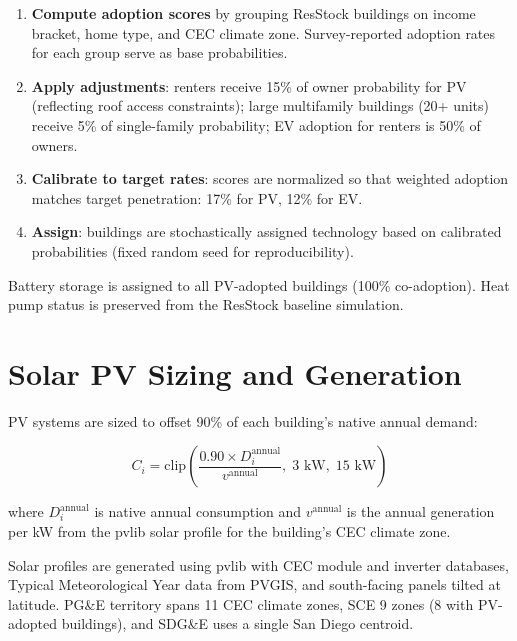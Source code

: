 \documentclass[9pt]{article}
\begin{document}
\begin{enumerate}
\item \textbf{Compute adoption scores} by grouping ResStock buildings on income bracket, home type, and CEC climate zone. Survey-reported adoption rates for each group serve as base probabilities.

\item \textbf{Apply adjustments}: renters receive 15\% of owner probability for PV (reflecting roof access constraints); large multifamily buildings (20+ units) receive 5\% of single-family probability; EV adoption for renters is 50\% of owners.

\item \textbf{Calibrate to target rates}: scores are normalized so that weighted adoption matches target penetration: 17\% for PV, 12\% for EV.

\item \textbf{Assign}: buildings are stochastically assigned technology based on calibrated probabilities (fixed random seed for reproducibility).
\end{enumerate}

Battery storage is assigned to all PV-adopted buildings (100\% co-adoption). Heat pump status is preserved from the ResStock baseline simulation.

\section{Solar PV Sizing and Generation}
\label{sec:solar}

PV systems are sized to offset 90\% of each building's native annual demand:

\begin{equation}
C_i = \text{clip}\left(\frac{0.90 \times D_i^{\text{annual}}}{v^{\text{annual}}}, \; 3 \text{ kW}, \; 15 \text{ kW}\right)
\end{equation}

where $D_i^{\text{annual}}$ is native annual consumption and $v^{\text{annual}}$ is the annual generation per kW from the pvlib solar profile for the building's CEC climate zone.

Solar profiles are generated using pvlib with CEC module and inverter databases, Typical Meteorological Year data from PVGIS, and south-facing panels tilted at latitude. PG\&E territory spans 11 CEC climate zones, SCE 9 zones (8 with PV-adopted buildings), and SDG\&E uses a single San Diego centroid.
\end{document}
